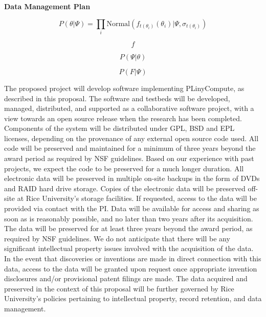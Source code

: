 
\begin{center}{\textbf{Data Management Plan}}\end{center}

$$P(\theta | \Psi) = \prod_i \textrm{Normal}(f_{t(\theta_i)}(\theta_i) | \Psi, \sigma_{t(\theta_i)})$$

$$f$$

$$P(\Psi | \theta)$$ 

$$P(F | \Psi)$$

The proposed project will develop software implementing PLinyCompute, as described in
this proposal. The software and testbeds will be developed, managed, distributed, and supported as a collaborative software
project, with a view towards an open source release when the research has been completed. Components of the system
will be distributed under GPL, BSD and EPL licenses, depending on the provenance of any external open source
code used. All code will be preserved and maintained for a minimum of three years beyond the award period
as required by NSF guidelines. Based on our experience with past projects, we expect the code to be preserved for
a much longer duration.
All electronic data will be preserved in multiple on-site backups in the form of DVDs and RAID hard drive
storage. Copies of the electronic data will be preserved off-site at Rice University's storage facilities. If requested,
access to the data will be provided via contact with the PI. Data will be available for access and sharing as soon as
is reasonably possible, and no later than two years after its acquisition. The data will be preserved for at least three
years beyond the award period, as required by NSF guidelines.
We do not anticipate that there will be any significant intellectual property issues involved with the acquisition of
the data. In the event that discoveries or inventions are made in direct connection with this data, access to the data
will be granted upon request once appropriate invention disclosures and/or provisional patent filings are made.
The data acquired and preserved in the context of this proposal will be further governed by Rice University's
policies pertaining to intellectual property, record retention, and data management.

